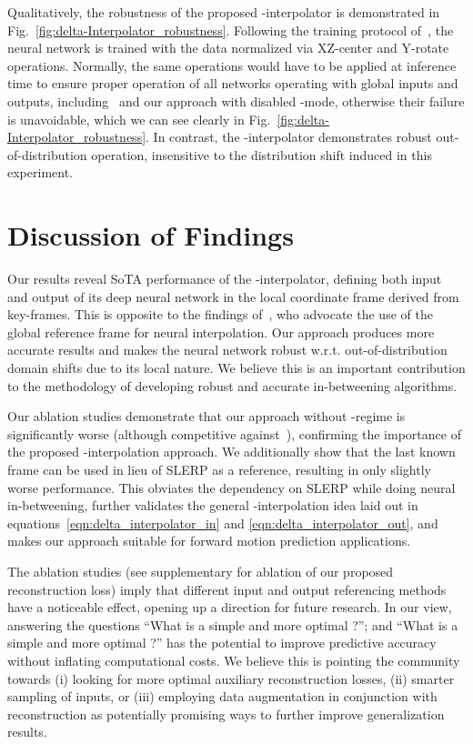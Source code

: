 \documentclass[letterpaper]{article} \usepackage[]{aaai23}  \usepackage{times}  \usepackage{helvet}  \usepackage{courier}  \usepackage[hyphens]{url}  \usepackage{graphicx} \urlstyle{rm} \def\UrlFont{\rm}  \usepackage{natbib}  \usepackage{caption} \frenchspacing  \setlength{\pdfpagewidth}{8.5in} \setlength{\pdfpageheight}{11in}
\begin{document}
Qualitatively, the robustness of the proposed -interpolator is demonstrated in Fig.~\ref{fig:delta-Interpolator_robustness}. Following the training protocol of~\citet{harvey2020robust}, the neural network is trained with the data normalized via XZ-center and Y-rotate operations. Normally, the same operations would have to be applied at inference time to ensure proper operation of all networks operating with global inputs and outputs, including~\citep{harvey2020robust, duan2021singleshot} and our approach with disabled -mode, otherwise their failure is unavoidable, which we can see clearly in Fig.~\ref{fig:delta-Interpolator_robustness}. In contrast, the -interpolator demonstrates robust out-of-distribution operation, insensitive to the distribution shift induced in this experiment.





\section{Discussion of Findings} \label{sec:discussion_of_findings}
Our results reveal SoTA performance of the -interpolator, defining both input and output of its deep neural network in the local coordinate frame derived from key-frames. This is opposite to the findings of~\citet{duan2021singleshot}, who advocate the use of the global reference frame for neural interpolation. Our approach produces more accurate results and makes the neural network robust w.r.t. out-of-distribution domain shifts due to its local nature. We believe this is an important contribution to the methodology of developing robust and accurate in-betweening algorithms. 

Our ablation studies demonstrate that our approach without -regime is significantly worse (although competitive against~\cite{duan2021singleshot}), confirming the importance of the proposed -interpolation approach. We additionally show that the last known frame can be used in lieu of SLERP as a reference, resulting in only slightly worse performance. This obviates the dependency on SLERP while doing neural in-betweening, further validates the general -interpolation idea laid out in equations~\eqref{eqn:delta_interpolator_in} and \eqref{eqn:delta_interpolator_out}, and makes our approach suitable for forward motion prediction applications. 

The ablation studies (see supplementary for ablation of our proposed reconstruction loss) imply that different input and output referencing methods have a noticeable effect, opening up a direction for future research. In our view, answering the questions ``What is a simple and more optimal ?''; and ``What is a simple and more optimal ?'' has the potential to improve predictive accuracy without inflating computational costs. 
We believe this is pointing the community towards (i) looking for more optimal auxiliary reconstruction losses, (ii)  smarter sampling of inputs, or (iii) employing data augmentation in conjunction with reconstruction as potentially promising ways to further improve generalization results.
\end{document}
